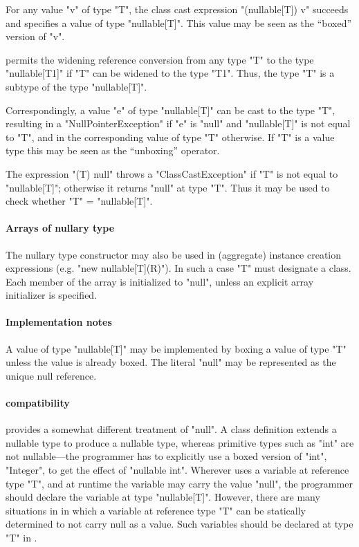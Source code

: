 For any value \xcd"v" of type \xcd"T", the class cast expression
\xcd"(nullable[T]) v" succeeds and specifies a value of type \xcd"nullable[T]".
This value may be seen as the ``boxed'' version of \xcd"v".

\Xten{} permits the widening reference conversion from any type \xcd"T"
to the type \xcd"nullable[T1]" if \xcd"T" can be widened to the
type \xcd"T1". Thus, the type \xcd"T" is a subtype of the type \xcd"nullable[T]".

Correspondingly, a value \xcd"e" of type \xcd"nullable[T]" can be cast to the
type \xcd"T", resulting in a \xcd"NullPointerException" if \xcd"e" is
\xcd"null" and \xcd"nullable[T]" is not equal to \xcd"T", and in the
corresponding value of type \xcd"T" otherwise.  If \xcd"T" is a value
type this may be seen as the ``unboxing'' operator.

The expression \xcd"(T) null" throws a \xcd"ClassCastException"
if \xcd"T" is not equal to \xcd"nullable[T]"; otherwise it
returns \xcd"null" at type \xcd"T". Thus it may be used to check
whether \xcd"T" = \xcd"nullable[T]".

\paragraph{Arrays of nullary type}
The nullary type constructor may also be used in (aggregate) instance
creation expressions (e.g.{} \xcd"new nullable[T](R)"). In such a
case \xcd"T" must designate a class. Each member of the array is
initialized to \xcd"null", unless an explicit array initializer is
specified.

\paragraph{Implementation notes}
A value of type \xcd"nullable[T]" may be implemented by boxing a value of
type \xcd"T" unless the value is already boxed. The literal \xcd"null"
may be represented as the unique null reference.

\paragraph{\Java{} compatibility}

\java{} provides a somewhat different treatment of \xcd"null".  A
class definition extends a nullable type to produce a nullable type,
whereas primitive types such as \xcd"int" are not nullable---the
programmer has to explicitly use a boxed version of \xcd"int",
\xcd"Integer", to get the effect of \xcd"nullable int". Wherever \Java{} uses a
variable at reference type \xcd"T", and at runtime the variable may
carry the value \xcd"null", the \Xten{} programmer should declare the
variable at type \xcd"nullable[T]". However, there are many situations
in \java{} in which a variable at reference type \xcd"T" can be
statically determined to not carry null as a value. Such variables
should be declared at type \xcd"T" in \Xten{}.

